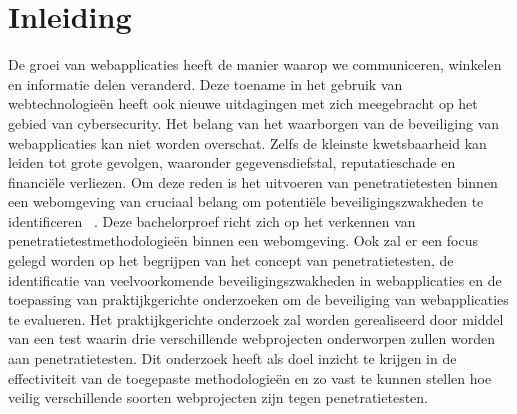 


% 

\section{Inleiding}%
\label{sec:inleiding}

De groei van webapplicaties heeft de manier waarop we communiceren, winkelen en informatie delen veranderd. Deze toename in het gebruik
van webtechnologieën heeft ook nieuwe uitdagingen met zich meegebracht op het gebied van cybersecurity. Het belang van het waarborgen
van de beveiliging van webapplicaties kan niet worden overschat. Zelfs de kleinste kwetsbaarheid kan leiden tot grote gevolgen, waaronder gegevensdiefstal,
reputatieschade en financiële verliezen. Om deze reden is het uitvoeren van penetratietesten binnen een webomgeving van cruciaal
belang om potentiële beveiligingszwakheden te identificeren ~\autocite{Nagendran2019}. Deze bachelorproef richt zich op het verkennen
van penetratietestmethodologieën binnen een webomgeving. Ook zal er een focus gelegd worden op het begrijpen van het concept van penetratietesten,
de identificatie van veelvoorkomende beveiligingszwakheden in webapplicaties en de toepassing van praktijkgerichte onderzoeken om
de beveiliging van webapplicaties te evalueren. Het praktijkgerichte onderzoek zal worden gerealiseerd door middel van een test waarin drie
verschillende webprojecten onderworpen zullen worden aan penetratietesten. Dit onderzoek heeft als doel inzicht te krijgen in de effectiviteit van de
toegepaste methodologieën en zo vast te kunnen stellen hoe veilig verschillende soorten webprojecten zijn tegen penetratietesten.

